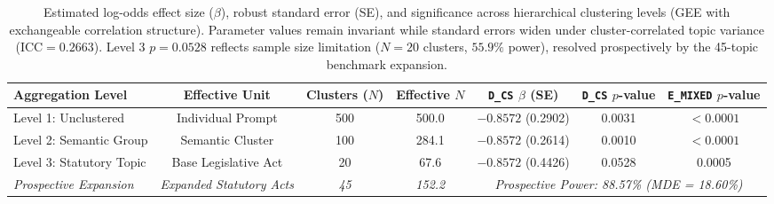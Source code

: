\begin{table}[t]
\centering
\small
\begin{tabular}{lcccccc}
\toprule
\textbf{Aggregation Level} & \textbf{Effective Unit} & \textbf{Clusters ($N$)} & \textbf{Effective $N$} & \texttt{D\_CS} $\beta$ \textbf{(SE)} & \texttt{D\_CS} $p$\textbf{-value} & \texttt{E\_MIXED} $p$\textbf{-value} \\
\midrule
Level 1: Unclustered & Individual Prompt & 500 & 500.0 & $-0.8572$ (0.2902) & 0.0031 & $< 0.0001$ \\
Level 2: Semantic Group & Semantic Cluster & 100 & 284.1 & $-0.8572$ (0.2614) & 0.0010 & $< 0.0001$ \\
Level 3: Statutory Topic & Base Legislative Act & 20 & 67.6 & $-0.8572$ (0.4426) & 0.0528 & 0.0005 \\
\midrule
\textit{Prospective Expansion} & \textit{Expanded Statutory Acts} & \textit{45} & \textit{152.2} & \multicolumn{3}{c}{\textit{Prospective Power: 88.57\% (MDE = 18.60\%)}} \\
\bottomrule
\end{tabular}
\caption{Estimated log-odds effect size ($\beta$), robust standard error (SE), and significance across hierarchical clustering levels (GEE with exchangeable correlation structure). Parameter values remain invariant while standard errors widen under cluster-correlated topic variance ($\text{ICC} = 0.2663$). Level 3 $p=0.0528$ reflects sample size limitation ($N=20$ clusters, $55.9\%$ power), resolved prospectively by the 45-topic benchmark expansion.}
\label{tab:clustered_gee}
\end{table}
